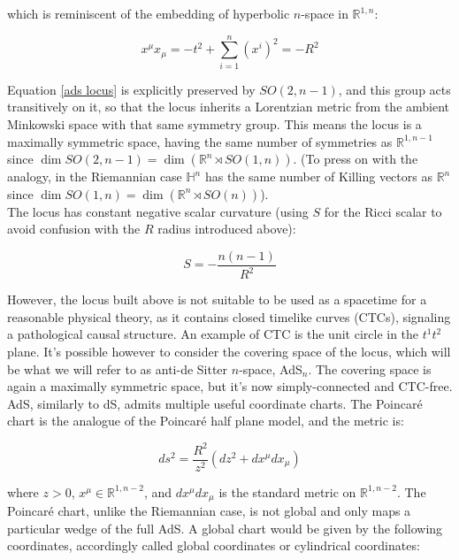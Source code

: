 \documentclass[11pt,a4paper,oneside,openright,titlepage]{book}
\begin{document}
which is reminiscent of the embedding of hyperbolic $n$-space in $\mathbb{R}^{1,n}$:

\begin{equation}
x^\mu x_\mu = -t^2 + \sum_{i=1}^{n} (x^i)^2 = - R^2
\end{equation}

Equation \ref{ads locus} is explicitly preserved by $SO(2,n-1)$, and this group acts transitively on it, so that the locus inherits a Lorentzian metric from the ambient Minkowski space with that same symmetry group. This means the locus is a maximally symmetric space, having the same number of symmetries as $\mathbb{R}^{1,n-1}$ since $\dim SO(2,n-1) = \dim \left( \mathbb{R}^n \rtimes SO(1,n) \right)$. (To press on with the analogy, in the Riemannian case $\mathbb{H}^n$ has the same number of Killing vectors as $\mathbb{R}^n$ since $\dim SO(1,n) = \dim \left(\mathbb{R}^n \rtimes SO(n) \right)$).\\

The locus has constant negative scalar curvature (using $S$ for the Ricci scalar to avoid confusion with the $R$ radius introduced above):

\begin{equation}
S = - \frac{n(n-1)}{R^2} 
\end{equation}

However, the locus built above is not suitable to be used as a spacetime for a reasonable physical theory, as it contains closed timelike curves (CTCs), signaling a pathological causal structure. An example of CTC is the unit circle in the $t^1 t^2$ plane. It's possible however to consider the covering space of the locus, which will be what we will refer to as anti-de Sitter $n$-space, AdS$_n$. The covering space is again a maximally symmetric space, but it's now simply-connected and CTC-free.\\

AdS, similarly to dS, admits multiple useful coordinate charts. The Poincaré chart is the analogue of the Poincaré half plane model, and the metric is:

\begin{equation} \label{poincarechart}
ds^2 = \frac{R^2}{z^2} \left(dz^2 + dx^\mu dx_\mu \right)
\end{equation}

where $z>0$, $x^\mu \in \mathbb{R}^{1,n-2}$, and $dx^\mu dx_\mu$ is the standard metric on $\mathbb{R}^{1,n-2}$. The Poincaré chart, unlike the Riemannian case, is not global and only maps a particular wedge of the full AdS. A global chart would be given by the following coordinates, accordingly called global coordinates or cylindrical coordinates:
\end{document}
